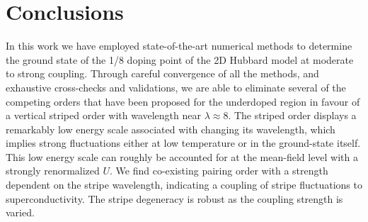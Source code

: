 \documentclass[12pt]{article}
\begin{document}

\section*{Conclusions}  In this work we have employed state-of-the-art numerical methods 
 to determine the ground state of the 1/8 doping point of the 2D Hubbard model at moderate to strong coupling. Through careful convergence of all the methods, and exhaustive cross-checks and validations, we are able to eliminate several of the competing orders that have been proposed for the underdoped region in favour of a vertical striped order with wavelength near $\lambda \approx 8$. The striped order displays a remarkably low energy scale associated with changing its wavelength, which
 implies strong fluctuations either at low temperature or in the ground-state itself. This low energy scale can roughly be accounted
 for at the mean-field level with
a strongly renormalized $U$. We find co-existing pairing order with a strength dependent on the stripe wavelength,
indicating a coupling of stripe fluctuations to superconductivity. The stripe degeneracy is robust as the coupling strength is varied.

\end{document}
